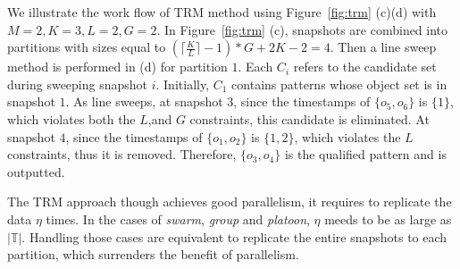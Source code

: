 \begin{example}
We illustrate the work flow of  TRM method using Figure~\ref{fig:trm} (c)(d) with $M=2, K=3, L = 2, G=2$. 
In Figure~\ref{fig:trm} (c), snapshots are combined into partitions with sizes equal to 
$(\lceil \frac{K}{L} \rceil-1) *G+2K - 2 = 4$. Then a line sweep method is performed in (d) 
for partition $1$. Each $C_i$ refers to the candidate set during sweeping snapshot $i$. 
Initially, $C_1$ contains patterns whose object set is in snapshot $1$.
As line sweeps, at snapshot $3$, since the timestamps of  $\{o_5,o_6\}$ is $\{1\}$, which violates both the $L$,and $G$ constraints, this candidate is eliminated.
At snapshot $4$, since the timestamps of $\{o_1,o_2\}$ is $\{1,2\}$, which violates the $L$ constraints, thus it is removed. Therefore, $\{o_3,o_4\}$ is the qualified pattern and is outputted.
\end{example}

The TRM approach though achieves good parallelism, 
it requires to replicate the data $\eta$ times. 
In the cases of \emph{swarm}, \emph{group} and \emph{platoon}, $\eta$ meeds to be as large as $|\mathbb{T}|$. 
Handling those cases are equivalent to replicate the entire snapshots to each partition, 
which surrenders the benefit of parallelism.



